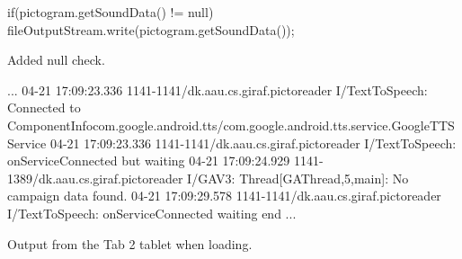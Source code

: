 
\begin{listing}
    \begin{java2}
        if(pictogram.getSoundData() != null) {
            fileOutputStream.write(pictogram.getSoundData());
        }
    \end{java2}
    \caption{Added null check.}
    \label{lst:null_check_sound_stream}
\end{listing}

\begin{listing}
    \begin{bashblock}
        ...
        04-21 17:09:23.336 1141-1141/dk.aau.cs.giraf.pictoreader I/TextToSpeech: Connected to ComponentInfo{com.google.android.tts/com.google.android.tts.service.GoogleTTSService}
        04-21 17:09:23.336 1141-1141/dk.aau.cs.giraf.pictoreader I/TextToSpeech: onServiceConnected but waiting
        04-21 17:09:24.929 1141-1389/dk.aau.cs.giraf.pictoreader I/GAV3: Thread[GAThread,5,main]: No campaign data found.
        04-21 17:09:29.578 1141-1141/dk.aau.cs.giraf.pictoreader I/TextToSpeech: onServiceConnected waiting end
        ...
    \end{bashblock}
    \caption{Output from the Tab 2 tablet when loading.}
    \label{lst:p5110_output}
\end{listing}
